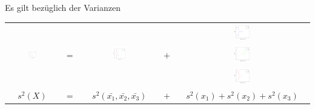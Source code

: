 \begin{frame}
  {Es gilt bezüglich der Varianzen}

  \begin{center}
    \begin{tabular}[h!]{ccccc}
      \multirow{3}{*}{\includegraphics[width=0.175\textwidth]{graphics/anova_var_total}} & \multirow{3}{*}{$=$} & \multirow{3}{*}{\includegraphics[width=0.175\textwidth]{graphics/anova_var_between}} & \multirow{3}{*}{$+$} & \includegraphics[width=0.125\textwidth]{graphics/anova_var_x1} \\
      &&&& \includegraphics[width=0.125\textwidth]{graphics/anova_var_x2} \\
      &&&& \includegraphics[width=0.125\textwidth]{graphics/anova_var_x3} \\
      \hline
      $s^2(X)$ & $=$ & $s^2(\bar{x_1},\bar{x_2},\bar{x_3})$ & $+$ & $s^2(x_1)+s^2(x_2)+s^2(x_3)$ \\
    \end{tabular}\\
    \Zeile
  \end{center}
\end{frame}

